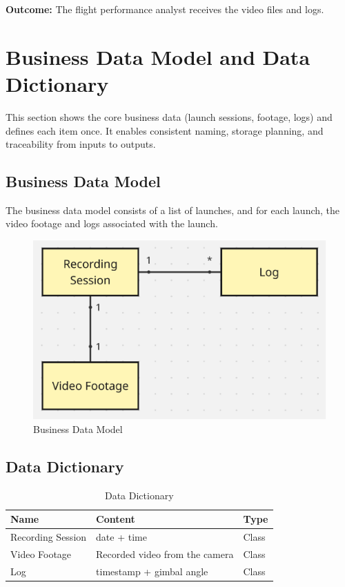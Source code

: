 \documentclass[12pt]{article}
\begin{document}
\textbf{Outcome:} The flight performance analyst receives the video files and logs.

\section{Business Data Model and Data Dictionary}
This section shows the core business data (launch sessions, footage, logs) and defines each item once.
It enables consistent naming, storage planning, and traceability from inputs to outputs.
\subsection{Business Data Model}

The business data model consists of a list of launches, and for each launch,
the video footage and logs associated with the launch.

\begin{figure}[H]
  \centering
  \includegraphics[width=\textwidth,height=\textheight,keepaspectratio]{../Images/business_data_model.png}
  \caption{Business Data Model}
  \label{img:business-data-model}
\end{figure}

\subsection{Data Dictionary}

\begin{table}[H]
  \centering
  \setlength\extrarowheight{5mm}
  \begin{tabularx}{\textwidth}{lXp{1in}}
    \toprule \textbf{Name} & \textbf{Content}               &
    \textbf{Type}                                             \\
    \midrule
    Recording Session      & date + time                    &
    Class
    \\
    Video Footage          & Recorded video from the camera &
    Class
    \\
    Log                    & timestamp + gimbal angle       &
    Class
    \\
    \bottomrule
  \end{tabularx}
  \caption{Data Dictionary}
  \label{tab:data-dictionary}
\end{table}
\end{document}
